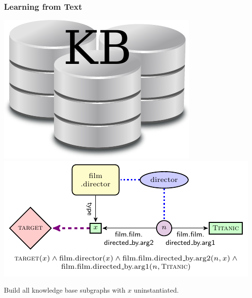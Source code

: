 \documentclass[mathserif,12pt]{beamer}
\begin{document}
\begin{frame}
\frametitle{Learning from Text}
\begin{center}

\vspace{.5cm}

\includegraphics[scale=.3]{figures/db} \includegraphics[scale=1.2]{figures/unique_example_grounded1}
\vspace{.5cm}

Build all knowledge base subgraphs with $x$ uninstantiated.
\end{center}
\end{frame}
\end{document}
